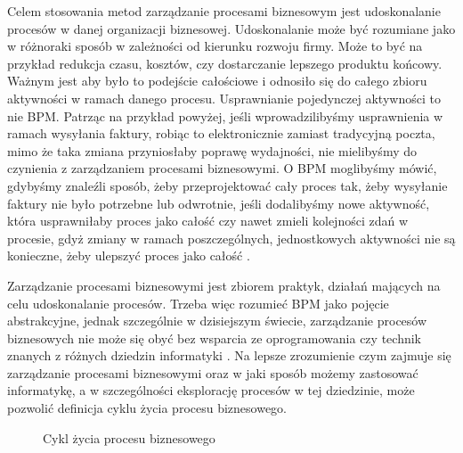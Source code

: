 Celem stosowania metod zarządzanie procesami biznesowym jest udoskonalanie procesów w danej organizacji biznesowej. Udoskonalanie może być rozumiane jako w różnoraki sposób w zależności od kierunku rozwoju firmy. Może to być na przykład redukcja czasu, kosztów, czy dostarczanie lepszego produktu końcowy. Ważnym jest aby było to podejście całościowe i odnosiło się do całego zbioru aktywności w ramach danego procesu. Usprawnianie pojedynczej aktywności to nie BPM. Patrząc na przykład powyżej, jeśli wprowadzilibyśmy usprawnienia w ramach wysyłania faktury, robiąc to elektronicznie zamiast tradycyjną poczta, mimo że taka zmiana przyniosłaby poprawę wydajności, nie mielibyśmy do czynienia z zarządzaniem procesami biznesowymi. O BPM moglibyśmy mówić, gdybyśmy  znaleźli sposób, żeby przeprojektować cały proces tak, żeby wysyłanie faktury nie było potrzebne lub odwrotnie, jeśli dodalibyśmy nowe aktywność, która usprawniłaby proces jako całość czy nawet zmieli kolejności zdań w procesie, gdyż zmiany w ramach poszczególnych, jednostkowych aktywności nie są konieczne, żeby ulepszyć proces jako całość \cite{BPMWhat}.

Zarządzanie procesami biznesowymi jest zbiorem praktyk, działań mających na celu udoskonalanie procesów. Trzeba więc rozumieć BPM jako pojęcie abstrakcyjne, jednak szczególnie w dzisiejszym świecie, zarządzanie procesów biznesowych nie może się obyć bez wsparcia ze oprogramowania czy technik znanych z różnych dziedzin informatyki \cite{BPMSurvey}. Na lepsze zrozumienie czym zajmuje się zarządzanie procesami biznesowymi oraz w jaki sposób możemy zastosować informatykę, a w szczególności eksplorację procesów w tej dziedzinie, może pozwolić definicja cyklu życia procesu biznesowego.

\begin{figure}[h]
	\caption{\label{fig:lifecycle}Cykl życia procesu biznesowego}
\end{figure}

